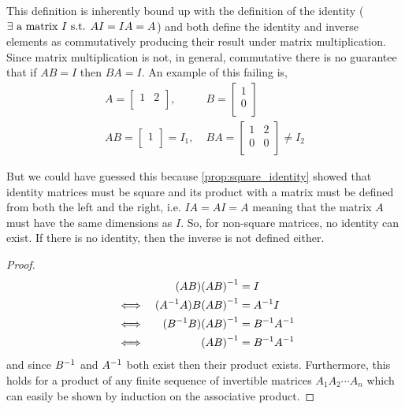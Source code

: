 \documentclass[../MathsNotesBase.tex]{subfiles}
\begin{document}
{		\medskip
		This definition is inherently bound up with the definition of the identity ($\exists \text{ a matrix } I \text{ s.t. } AI = IA = A$) and both define the identity and inverse elements as commutatively producing their result under matrix multiplication. Since matrix multiplication is not, in general, commutative there is no guarantee that if $AB = I$ then $BA = I$. An example of this failing is,
		\begin{align*}
			A = 
			\begin{bmatrix}
			1 & 2 \\
			\end{bmatrix},\;
			&B =
			\begin{bmatrix}
			1 \\
			0 \\
			\end{bmatrix}
			\\[10pt]
			AB = 
			\begin{bmatrix}
			1 \\
			\end{bmatrix} = I_1,\;
			&BA =
			\begin{bmatrix}
			1 & 2 \\
			0 & 0 \\
			\end{bmatrix} \neq I_2
		\end{align*}
		
		But we could have guessed this because \autoref{prop:square_identity} showed that identity matrices must be square and its product with a matrix must be defined from both the left and the right, i.e. $IA = AI = A$ meaning that the matrix $A$ must have the same dimensions as $I$. So, for non-square matrices, no identity can exist. If there is no identity, then the inverse is not defined either.
		
		\medskip
		\begin{proof}
		\begin{align*}
		& 	  &	(AB){(AB)}^{-1} &= I \\
		&\iff &	({A}^{-1}A)B{(AB)}^{-1} &= {A}^{-1}I \\
		&\iff &	({B}^{-1}B){(AB)}^{-1} &= {B}^{-1}{A}^{-1} \\
		&\iff &	{(AB)}^{-1} &= {B}^{-1}{A}^{-1} \\
		\end{align*}
		and since ${B}^{-1}$ and ${A}^{-1}$ both exist then their product exists.
		Furthermore, this holds for a product of any finite sequence of invertible matrices $A_1A_2\cdots A_n$ which can easily be shown by induction on the associative product.
		\end{proof}
	
}
\end{document}
